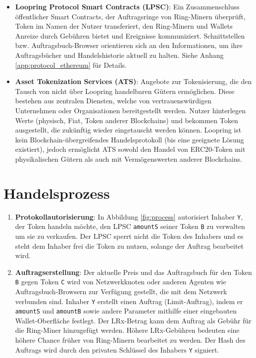 \documentclass[UTF8,nofonts]{article}
\begin{document}
\begin{multicols}{2}
\begin{itemize}
\item \textbf{Loopring Protocol Smart Contracts (LPSC)}: Ein Zusammenschluss öffentlicher Smart Contracts, der Auftragsringe von Ring-Minern überprüft, Token im Namen der Nutzer transferiert, den Ring-Minern und Wallets Anreize durch Gebühren bietet und Ereignisse kommuniziert. Schnittstellen bzw. Auftragsbuch-Browser orientieren sich an den Informationen, um ihre Auftragsbücher und Handelshistorie aktuell zu halten. Siehe Anhang \ref{app:protocol_ethereum} für Details.

\item \textbf{Asset Tokenization Services (ATS)}: Angebote zur Tokenisierung, die den Tausch von nicht über Loopring handelbaren Gütern ermöglichen. Diese bestehen aus zentralen Diensten, welche von vertrauenswürdigen Unternehmen oder Organisationen bereitgestellt werden. Nutzer hinterlegen Werte (physisch, Fiat, Token anderer Blockchains) und bekommen Token ausgestellt, die zukünftig wieder eingetauscht werden können. Loopring ist kein Blockchain-übergreifendes Handelsprotokoll (bis eine geeignete Lösung existiert), jedoch ermöglicht ATS sowohl den Handel von ERC20-Token \cite{ERC20} mit physikalischen Gütern als auch mit Vermögenswerten anderer Blockchains.

\end{itemize}


\section{Handelsprozess\label{sec:process}}



\begin{enumerate} 


\item \textbf{Protokollautorisierung}: In Abbildung \ref{fig:process} autorisiert Inhaber \verb|Y|, der Token handeln möchte, den LPSC \verb|amountS| seiner Token \verb|B| zu verwalten um sie zu verkaufen. Der LPSC sperrt nicht die Token des Inhabers und es steht dem Inhaber frei die Token zu nutzen, solange der Auftrag bearbeitet wird.

\item \textbf{Auftragserstellung}: Der aktuelle Preis und das Auftragsbuch für den Token \verb|B| gegen Token \verb|C| wird von Netzwerkknoten oder anderen Agenten wie Auftragsbuch-Browsern zur Verfügung gestellt, die mit dem Netzwerk verbunden sind. Inhaber \verb|Y| erstellt einen Auftrag (Limit-Auftrag), indem er \verb|amountS| und \verb|amountB| sowie andere Parameter mithilfe einer eingebauten Wallet-Oberfläche festlegt. Der LRx-Betrag kann dem Auftrag als Gebühr für die Ring-Miner hinzugefügt werden. Höhere LRx-Gebühren bedeuten eine höhere Chance früher von Ring-Minern bearbeitet zu werden. Der Hash des Auftrags wird durch den privaten Schlüssel des Inhabers \verb|Y| signiert.


\end{enumerate}
\end{multicols}
\end{document}
